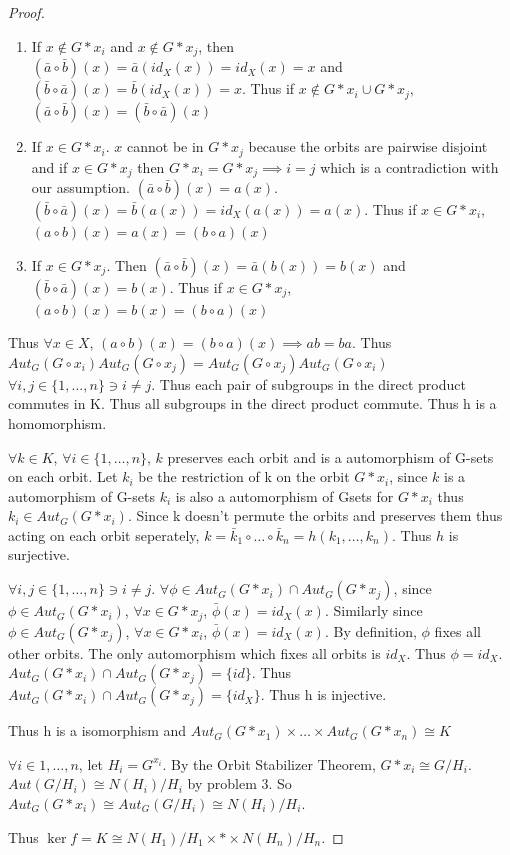 \documentclass{article}
\begin{document}
\begin{proof}
    \begin{enumerate}
        \item If $x \not \in G \ast x_i$ and $x \not \in G \ast x_j$, then $(\bar a \circ \bar b)(x) = \bar a(id_X(x)) = id_X(x) = x$ and $(\bar b \circ \bar a)(x) = \bar b(id_X(x)) = x$. Thus if $x \not \in G \ast x_i \cup G \ast x_j,$ $(\bar a \circ \bar b)(x) = (\bar b \circ \bar a)(x)$
        \item If $x \in G \ast x_i$. $x$ cannot be in $G \ast x_j$ because the orbits are pairwise disjoint and if $x \in G \ast x_j$ then $G \ast
        x_i = G \ast x_j \implies i = j$ which is a contradiction with our assumption. $(\bar a \circ \bar b)(x) = a(x)$. $(\bar b \circ \bar a)(x) = \bar b(a(x)) = id_X(a(x)) = a(x)$. Thus if $x \in G \ast x_i$, $(a \circ b)(x) = a(x) = (b \circ a)(x)$
        \item If $x \in G \ast x_j$. Then $(\bar a \circ \bar b)(x) = \bar a(b(x)) = b(x)$ and $(\bar b \circ \bar a)(x) = b(x)$. Thus if $x \in G \ast x_j$, $(a \circ b)(x) = b(x) = (b \circ a)(x)$ 
    \end{enumerate}

    Thus $\forall x \in X$, $(a \circ b)(x) = (b \circ a)(x) \implies ab = ba$. Thus $Aut_G(G \circ x_i)Aut_G(G \circ x_j) = Aut_G(G \circ x_j)Aut_G(G \circ x_i)$ $\forall i, j \in \{1, \ldots, n\} \ni i \neq j$. Thus each pair of subgroups in the direct product commutes in K. Thus all subgroups in the direct product commute. Thus h is a homomorphism. 

    $\forall k \in K$, $\forall i \in \{1, \ldots, n\}$, $k$ preserves each orbit and is a automorphism of G-sets on each orbit. Let $k_i$ be the restriction of k on the orbit $G \ast x_i$, since $k$ is a automorphism of G-sets $k_i$ is also a automorphism of Gsets for $G \ast x_i$ thus $k_i \in Aut_G(G \ast x_i)$. Since k doesn't permute the orbits and preserves them thus acting on each orbit seperately, $k = \bar k_1 \circ \ldots \circ \bar k_n = h(k_1, \ldots, k_n)$. Thus $h$ is surjective.


    $\forall i, j \in \{1, \ldots, n\} \ni i \neq j$. $\forall \phi \in Aut_G(G\ast x_i) \cap Aut_G(G \ast x_j)$, since $\phi \in Aut_G(G \ast x_i)$, $\forall x \in G \ast x_j$, $\bar \phi(x) = id_X(x)$. Similarly since $\phi \in Aut_G(G \ast x_j)$, $\forall x \in G \ast x_i$, $\bar \phi(x) = id_X(x)$. By definition, $\phi$ fixes all other orbits. The only automorphism which fixes all orbits is $id_X$. Thus $\phi = id_X$. $Aut_G(G\ast x_i) \cap Aut_G(G \ast x_j) = \{id\}$. Thus $Aut_G(G\ast x_i) \cap Aut_G(G \ast x_j) = \{id_X\}$. Thus h is injective.


    Thus h is a isomorphism and $Aut_G(G \ast x_1) \times \ldots \times Aut_G(G \ast x_n) \cong K$

    $\forall i \in {1, \ldots, n}$, let $H_i = G^{x_i}$. By the Orbit Stabilizer Theorem, $G \ast x_i \cong G/H_{i}$. $Aut(G/H_{i}) \cong N(H_i)/H_i$ by problem 3. So $Aut_G(G \ast x_i) \cong Aut_G(G/H_{i}) \cong N(H_i)/H_i$. 

    Thus $\ker f = K \cong N(H_1)/H_1 \times \ast \times N(H_n)/H_n$.
\end{proof}
\end{document}
